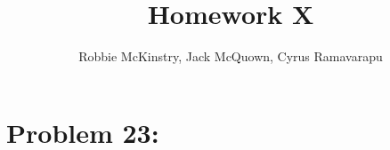 \documentclass[12pt]{article}
\begin{document}
\title{Homework X}
\author{Robbie McKinstry, Jack McQuown, Cyrus Ramavarapu}
\renewcommand{\today}{27 September 2016}
\renewcommand{\baselinestretch}{1.5}
\maketitle

\section*{Problem 23: }
\end{document}
